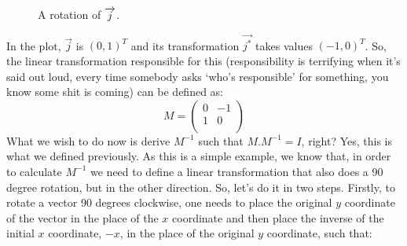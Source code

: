 \documentclass[600paper, 11pt,twoside,openany]{kdp}
\begin{document}
\begin{figure}[h!]
\begin{center}
\end{center}
\vspace*{2pt}
\caption{A rotation of $\protect\overrightarrow{j}$.}
\end{figure}
\par 
\vspace{-3pt}
\indent In the plot, $\overrightarrow{j}$ is $(0,1)^T$ and its transformation $\overrightarrow{j^*}$ takes values $(-1,0)^T$. So, the linear transformation responsible for this (responsibility is terrifying when it’s said out loud, every time somebody asks ‘who’s responsible’ for something, you know some shit is coming) can be defined as:
\[M = \begin{pmatrix}
0 & -1\\
1 & 0\\
\end{pmatrix}\]
\indent What we wish to do now is derive $M^{−1}$ such that $M.M^{−1}= I $, right? Yes, this is what we defined previously. As this is a simple example, we know that, in order to calculate $M^{-1}$ we need to define a linear transformation that also does a 90 degree rotation, but in the other direction. So, let’s do it in two steps. Firstly, to rotate a vector 90 degrees clockwise, one needs to place the original $y$ coordinate of the vector in the place of the $x$ coordinate and then place the inverse of the initial $x$ coordinate, $−x$, in the place of the original $y$ coordinate, such that:
\end{document}
